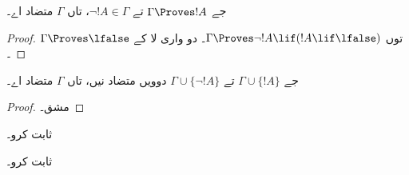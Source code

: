 \documentclass[../../../include/open-logic-section]{subfiles}
\begin{document}
\begin{prop}
  جے $\Gamma \Proves !A$ تے $\lnot !A \in \Gamma$، تاں $\Gamma$
  متضاد اے۔
\end{prop}

\begin{proof}
   توں $\Gamma \Proves \lnot !A \lif (!A \lif \lfalse)$۔
   دو واری لا کے $\Gamma \Proves \lfalse$۔
\end{proof}


\begin{prop}
  جے $\Gamma \cup \{!A\}$ تے $\Gamma \cup \{\lnot !A\}$
  دوویں متضاد نیں، تاں $\Gamma$ متضاد اے۔
\end{prop}

\begin{proof}
مشق۔
\end{proof}

\begin{prob}
   ثابت کرو۔
\end{prob}
\tagendprob

\begin{prob}
   ثابت کرو۔
\end{prob}
\tagendprob
\end{document}
